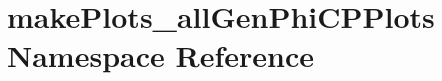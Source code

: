 \hypertarget{namespacemakePlots__allGenPhiCPPlots}{
\section{makePlots\_\-allGenPhiCPPlots Namespace Reference}
\label{namespacemakePlots__allGenPhiCPPlots}
}
